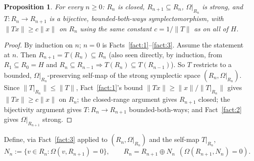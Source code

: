 \documentclass[11pt,a4paper]{article}
\newtheorem{proposition}[theorem]{Proposition}
\theoremstyle{definition}
\theoremstyle{remark}
\newcommand{\Om}{\Omega}
\begin{document}
\begin{proposition}
\label{prop:filtration}
For every $n\ge0$: $R_n$ is closed, $R_{n+1}\subseteq R_n$, $\Om|_{R_n}$ is strong, and
$T:R_n\to R_{n+1}$ is a bijective, bounded-both-ways symplectomorphism, with
$\|Tx\|\ge c\|x\|$ on $R_n$ using the same constant $c=1/\|T\|$ as on all of $H$.
\end{proposition}
\begin{proof}
By induction on $n$; $n=0$ is Facts~\ref{fact:1}--\ref{fact:3}. Assume the statement at $n$.
Then $R_{n+1}=T(R_n)\subseteq R_n$ (also seen directly, by induction, from
$R_1\subseteq R_0=H$ and $R_n\subseteq R_{n-1}\Rightarrow T(R_n)\subseteq T(R_{n-1})$). So
$T$ restricts to a bounded, $\Om|_{R_n}$-preserving self-map of the strong symplectic space
$(R_n,\Om|_{R_n})$. Since $\|T|_{R_n}\|\le\|T\|$, Fact~\ref{fact:1}'s bound
$\|Tx\|\ge\|x\|/\|T|_{R_n}\|$ gives $\|Tx\|\ge c\|x\|$ on $R_n$; the closed-range argument
gives $R_{n+1}$ closed; the bijectivity argument gives $T:R_n\to R_{n+1}$
bounded-both-ways; and Fact~\ref{fact:2} gives $\Om|_{R_{n+1}}$ strong.
\end{proof}

Define, via Fact~\ref{fact:3} applied to $(R_n,\Om|_{R_n})$ and the self-map $T|_{R_n}$,
\[
N_n:=\{v\in R_n:\Om(v,R_{n+1})=0\},\qquad R_n=R_{n+1}\oplus N_n\ \ (\Om(R_{n+1},N_n)=0).
\]
\end{document}
